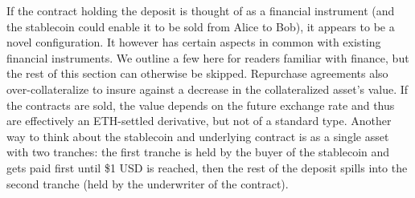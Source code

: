 If the contract holding the deposit is thought of as a financial instrument (and the stablecoin could enable it to be sold from Alice to Bob), it appears to be a novel configuration. It however has certain aspects in common with existing financial instruments. We outline a few here for readers familiar with finance, but the rest of this section can otherwise be skipped. Repurchase agreements also over-collateralize to insure against a decrease in the collateralized asset's value. If the contracts are sold, the value depends on the future exchange rate and thus are effectively an ETH-settled derivative, but not of a standard type. Another way to think about the stablecoin and underlying contract is as a single asset with two tranches: the first tranche is held by the buyer of the stablecoin and gets paid first until \$1 USD is reached, then the rest of the deposit spills into the second tranche (held by the underwriter of the contract). 



